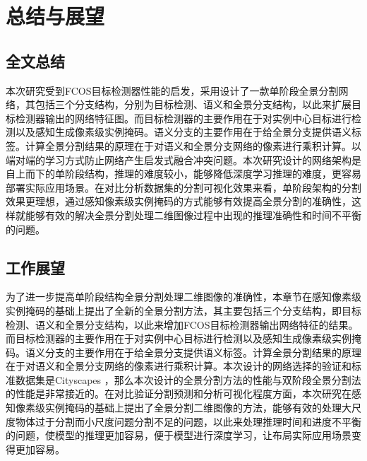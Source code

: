 \chapter{总结与展望}
\section{全文总结}
本次研究受到FCOS目标检测器性能的启发，采用设计了一款单阶段全景分割网络，其包括三个分支结构，分别为目标检测、语义和全景分支结构，以此来扩展目标检测器输出的网络特征图。而目标检测器的主要作用在于对实例中心目标进行检测以及感知生成像素级实例掩码。语义分支的主要作用在于给全景分支提供语义标签。计算全景分割结果的原理在于对语义和全景分支网络的像素进行乘积计算。以端对端的学习方式防止网络产生启发式融合冲突问题。本次研究设计的网络架构是自上而下的单阶段结构，推理的难度较小，能够降低深度学习推理的难度，更容易部署实际应用场景。在对比分析数据集的分割可视化效果来看，单阶段架构的分割效果更理想，通过感知像素级实例掩码的方式能够有效提高全景分割的准确性，这样就能够有效的解决全景分割处理二维图像过程中出现的推理准确性和时间不平衡的问题。

\section{工作展望}
为了进一步提高单阶段结构全景分割处理二维图像的准确性，本章节在感知像素级实例掩码的基础上提出了全新的全景分割方法，其主要包括三个分支结构，即目标检测、语义和全景分支结构，以此来增加FCOS目标检测器输出网络特征的结果。而目标检测器的主要作用在于对实例中心目标进行检测以及感知生成像素级实例掩码。语义分支的主要作用在于给全景分支提供语义标签。计算全景分割结果的原理在于对语义和全景分支网络的像素进行乘积计算。本次设计的网络选择的验证和标准数据集是Cityscapes ，那么本次设计的全景分割方法的性能与双阶段全景分割法的性能是非常接近的。在对比验证分割预测和分析可视化程度方面，本次研究在感知像素级实例掩码的基础上提出了全景分割二维图像的方法，能够有效的处理大尺度物体过于分割而小尺度问题分割不足的问题，以此来处理推理时间和进度不平衡的问题，使模型的推理更加容易，便于模型进行深度学习，让布局实际应用场景变得更加容易。
